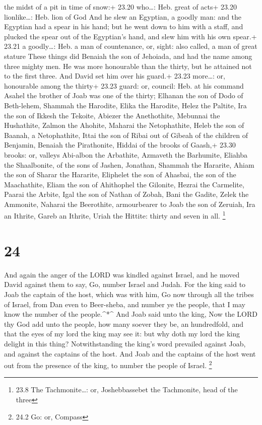 the midst of a pit in time of snow:+ 23.20 who\ldots: Heb. great of
acts+ 23.20 lionlike\ldots: Heb. lion of God  And he slew
an Egyptian, a goodly man: and the Egyptian had a spear in his hand; but
he went down to him with a staff, and plucked the spear out of the
Egyptian's hand, and slew him with his own spear.+ 23.21 a goodly\ldots:
Heb. a man of countenance, or, sight: also called, a man of great
stature  These things did Benaiah the son of Jehoiada, and
had the name among three mighty men.  He was more
honourable than the thirty, but he attained not to the first three. And
David set him over his guard.+ 23.23 more\ldots: or, honourable among
the thirty+ 23.23 guard: or, council: Heb. at his command 
Asahel the brother of Joab was one of the thirty; Elhanan the son of
Dodo of Beth-lehem,  Shammah the Harodite, Elika the
Harodite,  Helez the Paltite, Ira the son of Ikkesh the
Tekoite,  Abiezer the Anethothite, Mebunnai the Hushathite,
 Zalmon the Ahohite, Maharai the Netophathite,
 Heleb the son of Baanah, a Netophathite, Ittai the son of
Ribai out of Gibeah of the children of Benjamin,  Benaiah
the Pirathonite, Hiddai of the brooks of Gaash,+ 23.30 brooks: or,
valleys  Abi-albon the Arbathite, Azmaveth the Barhumite,
 Eliahba the Shaalbonite, of the sons of Jashen, Jonathan,
 Shammah the Hararite, Ahiam the son of Sharar the
Hararite,  Eliphelet the son of Ahasbai, the son of the
Maachathite, Eliam the son of Ahithophel the Gilonite, 
Hezrai the Carmelite, Paarai the Arbite,  Igal the son of
Nathan of Zobah, Bani the Gadite,  Zelek the Ammonite,
Naharai the Beerothite, armourbearer to Joab the son of Zeruiah,
 Ira an Ithrite, Gareb an Ithrite,  Uriah the
Hittite: thirty and seven in all. \footnote{23.8 The Tachmonite\ldots:
  or, Joshebbassebet the Tachmonite, head of the three}

\hypertarget{section-23}{%
\section{24}\label{section-23}}

 And again the anger of the LORD was kindled against Israel,
and he moved David against them to say, Go, number Israel and Judah.
 For the king said to Joab the captain of the host, which
was with him, Go now through all the tribes of Israel, from Dan even to
Beer-sheba, and number ye the people, that I may know the number of the
people.\^{}*\^{}  And Joab said unto the king, Now the LORD
thy God add unto the people, how many soever they be, an hundredfold,
and that the eyes of my lord the king may see it: but why doth my lord
the king delight in this thing?  Notwithstanding the king's
word prevailed against Joab, and against the captains of the host. And
Joab and the captains of the host went out from the presence of the
king, to number the people of Israel. \footnote{24.2 Go: or, Compass}

